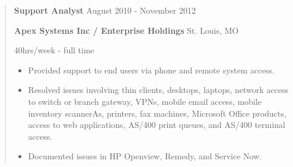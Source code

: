 \documentclass[../main.tex]{subfiles}
\begin{document}
\begin{quote}
\textbf{Support Analyst} 
\hfill 
August 2010 - November 2012

\textbf{Apex Systems Inc / Enterprise Holdings}
\hfill
St. Louis, MO

\hfill
40hrs/week - full time
\begin{itemize}
\item Provided support to end users via phone and remote system access. 
\item Resolved issues involving thin clients, desktops, laptops, network access to switch or branch gateway, VPNs, mobile email access, mobile inventory scannerAs, printers, fax machines, Microsoft Office products, access to web applications, AS/400 print queues, and AS/400 terminal access. 
\item Documented issues in HP Openview, Remedy, and Service Now.
\end{itemize}
\end{quote}
\end{document}
